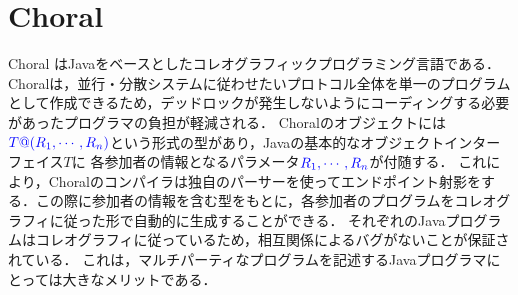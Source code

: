 \documentclass{thesis}
\begin{document}
\section{Choral}
Choral \cite{choral}はJavaをベースとしたコレオグラフィックプログラミング言語である．
Choralは，並行・分散システムに従わせたいプロトコル全体を単一のプログラムとして作成できるため，デッドロックが発生しないようにコーディングする必要があったプログラマの負担が軽減される．
Choralのオブジェクトには${\color{blue}{T@(R_1,\cdots,R_n)}}$という形式の型があり，Javaの基本的なオブジェクトインターフェイス$T$に
各参加者の情報となるパラメータ${\color{blue}{R_1,\cdots,R_n}}$が付随する．
これにより，Choralのコンパイラは独自のパーサーを使ってエンドポイント射影をする．この際に参加者の情報を含む型をもとに，各参加者のプログラムをコレオグラフィに従った形で自動的に生成することができる．
%
それぞれのJavaプログラムはコレオグラフィに従っているため，相互関係によるバグがないことが保証されている．
これは，マルチパーティなプログラムを記述するJavaプログラマにとっては大きなメリットである．
\end{document}

